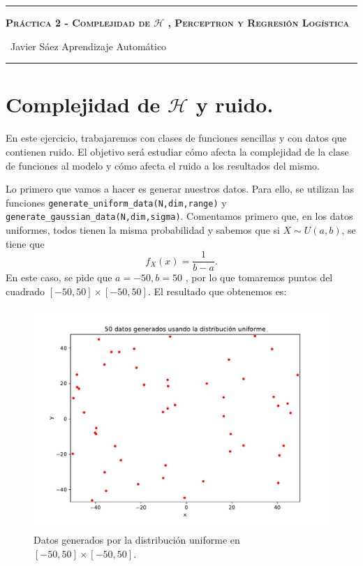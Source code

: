 \documentclass[12pt]{article}
\begin{document}
\begin{center}
	\hrule
	\vspace{.4cm}
	{\textbf { \large \scshape{ Práctica 2 - Complejidad de $\mathcal{H}$ , Perceptron y Regresión Logística}}}
\end{center}
{\ Javier Sáez \hspace{\fill} Aprendizaje Automático  \\
	\hrule

\section*{Complejidad de $\mathcal{H}$ y ruido.}

En este ejercicio, trabajaremos con clases de funciones sencillas y con datos que contienen ruido. El objetivo será estudiar cómo afecta 
la complejidad de la clase de funciones al modelo y cómo afecta el ruido a los resultados del mismo.

Lo primero que vamos a hacer es generar nuestros datos. Para ello, se utilizan las funciones \lstinline{generate_uniform_data(N,dim,range)} y \lstinline{generate_gaussian_data(N,dim,sigma)}. Comentamos primero que, en los datos uniformes, todos tienen la misma probabilidad y sabemos que si $X \sim U(a,b)$, se tiene que 
$$
f_X(x) = \frac{1}{b-a}.
$$
En este caso, se pide que $a = -50,b=50$ , por lo que tomaremos puntos del cuadrado $[-50,50] \times [-50,50]$. El resultado que obtenemos es:
\begin{figure}[H]
\centering
\includegraphics[scale = 0.4]{media/50-datos-uniforme.pdf}
\caption{Datos generados por la distribución uniforme en $[-50,50] \times [-50,50]$.}
\end{figure}

}
\end{document}
